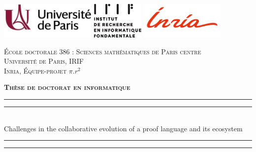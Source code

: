 %
\begin{titlingpage}
\begin{SingleSpace}
\calccentering{\unitlength} 


\includegraphics[height=1.8cm]{frontmatter/uni_paris.jpg}  \hfill
\includegraphics[height=1.8cm]{frontmatter/irif.eps} \hfill
\includegraphics[height=1.8cm]{frontmatter/inria.png}

\begin{center}

\textsc{\'Ecole doctorale 386 : Sciences math\'ematiques de Paris centre}\\
\vspace{2mm}
\textsc{Universit\'e de Paris, IRIF}\\
\vspace{2mm}
\textsc{Inria, \'Equipe-projet $\pi.r^2$}\\

\vspace{4mm}

\textsc{\Large \textbf{Th\`ese de doctorat en informatique}}\\

\vspace*{2mm}

\rule[0.5ex]{\linewidth}{2pt}\vspace*{-\baselineskip}\vspace*{3.2pt}
\rule[0.5ex]{\linewidth}{1pt}\\[\baselineskip]
\vspace{-0.35cm}
{\huge Challenges in the collaborative evolution of a proof language and its ecosystem }\\
\rule[0.5ex]{\linewidth}{1pt}\vspace*{-\baselineskip}\vspace*{3.4pt}
\rule[0.5ex]{\linewidth}{2pt}\\


\end{center}
\end{SingleSpace}
\end{titlingpage}
